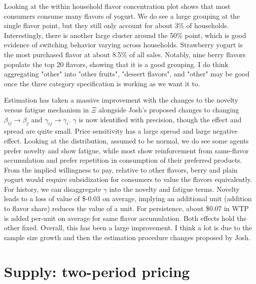 \documentclass[11pt]{article}
\begin{document}
Looking at the within household flavor concentration plot shows that most consumers consume many flavors of yogurt. We do see a large grouping at the single flavor point, but they still only account for about 3\% of households. Interestingly, there is another large cluster around the 50\% point, which is good evidence of switching behavior varying across households. Strawberry yogurt is the most purchased flavor at about 8.5\% of all sales. Notably, nine berry flavors populate the top 20 flavors, showing that it is a good grouping. I do think aggregating "other" into "other fruits", "dessert flavors", and "other" may be good once the three category specification is working as we want it to.

Estimation has taken a massive improvement with the changes to the novelty versus fatigue mechanism in $\Xi$ alongside Josh's proposed changes to changing $\beta_{ij}\rightarrow\beta_j$ and $\gamma_{ij}\rightarrow\gamma_i$. $\gamma$ is now identified with precision, though the effect and spread are quite small. Price sensitivity has a large spread and large negative effect. Looking at the distribution, assumed to be normal, we do see some agents prefer novelty and show fatigue, while most show reinforcement from same-flavor accumulation and prefer repetition in consumption of their preferred products. From the implied willingness to pay, relative to other flavors, berry and plain yogurt would require subsidization for consumers to value the flavors equivalently. For history, we can disaggregate $\gamma$ into the novelty and fatigue terms. Novelty leads to a loss of value of \$-0.03 on average, implying an additional unit (addition to flavor share) reduces the value of a unit. For persistence, about \$0.07 in WTP is added per-unit on average for same flavor accumulation. Both effects hold the other fixed. Overall, this has been a large improvement. I think a lot is due to the sample size growth and then the estimation procedure changes proposed by Josh.

\section{Supply: two-period pricing}
\end{document}

